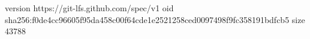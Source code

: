 version https://git-lfs.github.com/spec/v1
oid sha256:f0de4cc96605f95da458c00f64cde1e2521258ced0097498f9fc358191bdfcb5
size 43788
